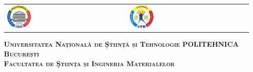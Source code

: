 



\begin{titlepage}
	\centering
	\begin{tabular}{p{6cm}p{3.3cm}}
		\includegraphics[width=0.2\textwidth]{img/upb.png} &
		\includegraphics[width=0.2\textwidth]{img/fsim.png}
	\end{tabular}
	\vspace{1cm}

	{\scshape\Large \textbf{Universitatea Națională de Știință și Tehnologie POLITEHNICA București} \\}
	{\scshape\Large \textbf{Facultatea de Știința și Ingineria Materialelor} \\}
	
\end{titlepage}

